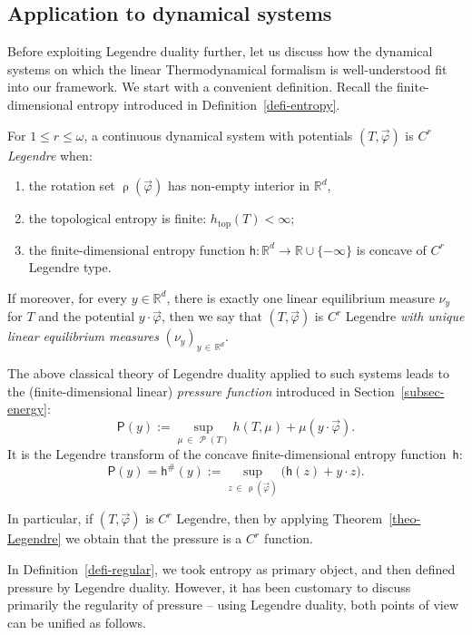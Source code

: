 \documentclass[AHL, Unicode, longabstracts,published]{cedram}
\theoremstyle{plain}
\theoremstyle{plain}
\renewcommand\top{{\mathrm{top}}}
\newcommand\vpot{\vec\pot}
\newcommand\Prob{{\operatorname{\mathscr{P}}}}
\newcommand{\rs}{\operatorname{\rho}}
\newcommand{\hf}{\mathsf{h}}
\newcommand{\Pf}{\mathsf{P}}
\newcommand{\pot}{\varphi}
\newcounter{In}
\newcommand*\8{\infty}
\newcommand\RR{\mathbb{R}}
\begin{document}
\subsection{Application to dynamical systems}

Before exploiting Legendre duality further, let us discuss how the dynamical systems on which the linear Thermodynamical formalism is well-understood fit into our framework. We start with a convenient definition. Recall the finite-dimensional entropy introduced in Definition~\ref{defi-entropy}.


\begin{defi}\label{defi-regular}
For $1\leq r\leq\omega$, a continuous dynamical system with potentials $(T,\vpot)$ is \emph{$C^r$ Legendre} when:
\begin{enumerate}
\item\label{item-interior}
the rotation set $\rs(\vpot)$ has non-empty interior in $\RR^d$,
\item the topological entropy is finite: $h_\top(T)<\infty$;
\item the finite-dimensional entropy function $\hf:\RR^d\to\RR\cup\{-\infty\}$ is concave of $C^r$ Legendre type.
\end{enumerate}

If moreover, for every $ y\in\RR^d$, there is exactly one linear equilibrium measure $\nu_{ y}$ for $T$ and the potential $ y\cdot\vpot$, then we say that $(T,\vpot)$ is $C^r$ Legendre \emph{with unique linear equilibrium measures} $(\nu_{ y})_{ y\,\in\,\RR^d}$.
\end{defi}

The above classical theory of Legendre duality {applied} to such systems leads to the (finite-dimensional linear) \emph{pressure function} introduced in Section~\ref{subsec-energy}:
\[
\Pf(y) := \sup_{\mu\,\in\,\Prob(T)} h(T,\mu)+ \mu(y\cdot \vpot).
\]
It is the Legendre transform of the concave finite-dimensional entropy function~$\hf$:
\[
\Pf(y) = \hf^\#(y) := \sup_{z\,\in\,\rs(\vpot)} \big(\hf(z) + y \cdot z \big).
\]

In particular, if $(T,\vpot)$ is $C^r$ Legendre, then by applying Theorem~\ref{theo-Legendre} we obtain that the pressure is a $C^r$ function.

In Definition~\ref{defi-regular}, we took entropy as primary object, and then defined pressure by Legendre duality. However, it has been customary to discuss primarily the regularity of pressure -- using Legendre duality, both points of view can be unified as follows.
\end{document}
